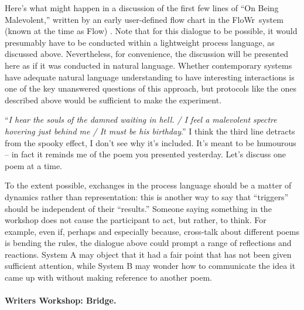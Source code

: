 \documentclass[letter]{article}
\newcommand{\Fw}{{\sf FloWr}}
\begin{document}
Here's what might happen in a discussion of the first few lines of
``On Being Malevolent,'' written by an early user-defined flow chart
in the \Fw\ system (known at the time as {\sf Flow})
\cite{colton-flowcharting}.  Note that for this dialogue to be
possible, it would presumably have to be conducted within a
lightweight process language, as discussed above.  Nevertheless, for
convenience, the discussion will be presented here as if it was
conducted in natural language.  Whether contemporary systems have
adequate natural language understanding to have interesting
interactions is one of the key unanswered questions of this approach,
but protocols like the ones described above would be sufficient to
make the experiment.

\begin{center}
\begin{minipage}{.9\columnwidth}
\begin{dialogue}
 ``\emph{I hear the souls of the
  damned waiting in hell. / I feel a malevolent
  spectre hovering just behind me / It must be
  his birthday}.''
%
 I think the third line detracts
from the spooky effect, I don't see why it's
included.
%
 It's meant to be humourous -- in fact it reminds me
of the poem you presented yesterday.
%
 Let's discuss one poem at a
time.
\end{dialogue}
\end{minipage}
\end{center}

To the extent possible, exchanges in the process language should be a
matter of dynamics rather than representation: this is another way to
say that ``triggers'' should be independent of their ``results.''
Someone saying something in the workshop does not cause the
participant to act, but rather, to think.  
%
For example, even if, perhaps and especially because, cross-talk about
different poems is bending the rules, the dialogue above could prompt
a range of reflections and reactions.  System A may object that it had
a fair point that has not been given sufficient attention, while
System B may wonder how to communicate the idea it came up with
without making reference to another poem.

\paragraph{Writers Workshop: Bridge.}
\end{document}
